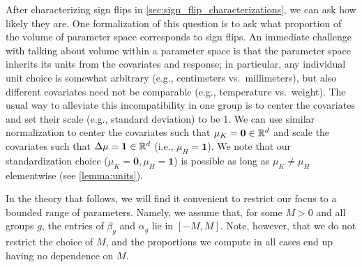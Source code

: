After characterizing sign flips in \cref{sec:sign_flip_characterizations}, we can ask how likely they are.
One formalization of this question is to ask what proportion of the volume of parameter space corresponds to sign flips.
An immediate challenge with talking about volume within a parameter space is that the parameter space inherits
its units from the covariates and response; in particular, any individual unit choice is somewhat
arbitrary (e.g., centimeters vs.\ millimeters), but also different covariates need not be 
comparable (e.g., temperature vs.\ weight). 
The usual way to alleviate this incompatibility in one group is to center the covariates and set their scale (e.g., standard deviation) to be 1. 
We can use similar normalization to center the covariates such that $\mu_K = \mathbf{0} \in \mathbb{R}^d$ and scale the covariates such that $\Delta\mu = \mathbf{1} \in \mathbb{R}^d$ (i.e., $\mu_H = \mathbf{1}$).
We note that our standardization choice ($\mu_K= \mathbf{0},\mu_H=\mathbf{1}$) is
possible as long as $\mu_K \neq \mu_H$ elementwise (see \cref{lemma:units}).




In the theory that follows, we will find it convenient to restrict our focus to a bounded range of parameters. Namely, we
assume that, for some $M > 0$ and all groups $g$, the entries of $\beta_g$ and $\alpha_g$ lie in $[-M,M]$.
Note, however, that we do not restrict the choice of $M$, and the proportions we compute in all
cases end up having no dependence on $M$.

